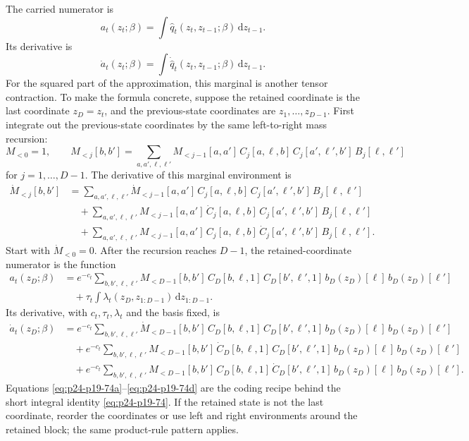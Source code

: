 \documentclass[11pt]{article}
\newcommand{\dd}{\,\mathrm d}
\begin{document}
The carried numerator is
\[
    a_t(z_t;\beta)
    =
    \int \widehat q_t(z_t,z_{t-1};\beta)\dd z_{t-1}.
    \label{eq:p24-p19-73}
\]
Its derivative is
\[
    \dot a_t(z_t;\beta)
    =
    \int \dot{\widehat q}_t(z_t,z_{t-1};\beta)\dd z_{t-1}.
    \label{eq:p24-p19-74}
\]
For the squared part of the approximation, this marginal is another tensor
contraction.  To make the formula concrete, suppose the retained coordinate is
the last coordinate \(z_D=z_t\), and the previous-state coordinates are
\(z_1,\ldots,z_{D-1}\).  First integrate out the previous-state coordinates by
the same left-to-right mass recursion:
\[
    M_{<0}=1,
    \qquad
    M_{<j}[b,b']
    =
    \sum_{a,a',\ell,\ell'}
    M_{<j-1}[a,a']\,
    C_j[a,\ell,b]\,
    C_j[a',\ell',b']\,
    B_j[\ell,\ell']
    \label{eq:p24-p19-74a}
\]
for \(j=1,\ldots,D-1\).  The derivative of this marginal environment is
\[
\begin{aligned}
    \dot M_{<j}[b,b']
    &=
    \sum_{a,a',\ell,\ell'}
    \dot M_{<j-1}[a,a']\,
    C_j[a,\ell,b]\,
    C_j[a',\ell',b']\,
    B_j[\ell,\ell']\\
    &\quad+
    \sum_{a,a',\ell,\ell'}
    M_{<j-1}[a,a']\,
    \dot C_j[a,\ell,b]\,
    C_j[a',\ell',b']\,
    B_j[\ell,\ell']\\
    &\quad+
    \sum_{a,a',\ell,\ell'}
    M_{<j-1}[a,a']\,
    C_j[a,\ell,b]\,
    \dot C_j[a',\ell',b']\,
    B_j[\ell,\ell'].
\end{aligned}
    \label{eq:p24-p19-74b}
\]
Start with \(\dot M_{<0}=0\).  After the recursion reaches \(D-1\), the
retained-coordinate numerator is the function
\[
\begin{aligned}
    a_t(z_D;\beta)
    &=
    e^{-c_t}
    \sum_{b,b',\ell,\ell'}
    M_{<D-1}[b,b']\,
    C_D[b,\ell,1]\,
    C_D[b',\ell',1]\,
    b_D(z_D)[\ell]\,
    b_D(z_D)[\ell']\\
    &\quad+
    \tau_t
    \int \lambda_t(z_D,z_{1:D-1})\dd z_{1:D-1}.
\end{aligned}
    \label{eq:p24-p19-74c}
\]
Its derivative, with \(c_t,\tau_t,\lambda_t\) and the basis fixed, is
\[
\begin{aligned}
    \dot a_t(z_D;\beta)
    &=
    e^{-c_t}
    \sum_{b,b',\ell,\ell'}
    \dot M_{<D-1}[b,b']\,
    C_D[b,\ell,1]\,
    C_D[b',\ell',1]\,
    b_D(z_D)[\ell]\,
    b_D(z_D)[\ell']\\
    &\quad+
    e^{-c_t}
    \sum_{b,b',\ell,\ell'}
    M_{<D-1}[b,b']\,
    \dot C_D[b,\ell,1]\,
    C_D[b',\ell',1]\,
    b_D(z_D)[\ell]\,
    b_D(z_D)[\ell']\\
    &\quad+
    e^{-c_t}
    \sum_{b,b',\ell,\ell'}
    M_{<D-1}[b,b']\,
    C_D[b,\ell,1]\,
    \dot C_D[b',\ell',1]\,
    b_D(z_D)[\ell]\,
    b_D(z_D)[\ell'].
\end{aligned}
    \label{eq:p24-p19-74d}
\]
Equations \eqref{eq:p24-p19-74a}--\eqref{eq:p24-p19-74d} are the coding recipe behind the short integral
identity \eqref{eq:p24-p19-74}.  If the retained state is not the last coordinate, reorder the
coordinates or use left and right environments around the retained block; the
same product-rule pattern applies.
\end{document}
